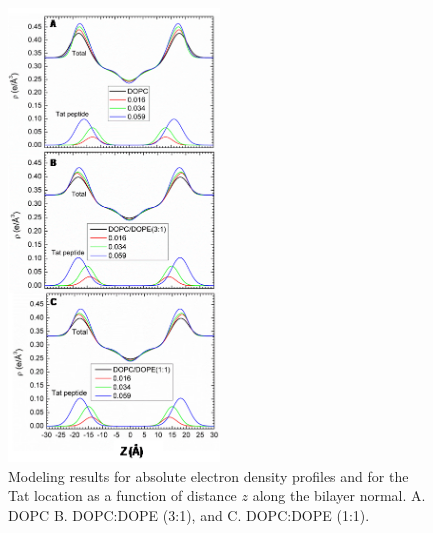 \begin{figure}
  \centering
  \includegraphics[width=0.5\textwidth]{figures/Tat/figure6}
  \caption{Modeling results for absolute electron density profiles
  and for the Tat location as a function of distance $z$ along the
  bilayer normal. A. DOPC B. DOPC:DOPE (3:1), and C. DOPC:DOPE (1:1).}
  \label{fig:figure6}
\end{figure}

